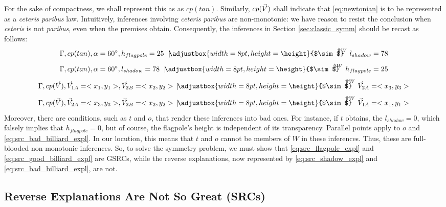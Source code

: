 \documentclass{svjour3}                     %
\newcommand{\ssim}{%
     \setbox0=\hbox{$\sim$}%
     \adjustbox{width=8pt,height=\height}{$\sim$}
}
\newcommand{\Uuparrow}{%
     \setbox0=\hbox{$\scriptstyle\Uparrow$}%
     \raisebox{.2ex}{$\scriptstyle\Uparrow$}
}
\newcommand{\nmc}{\mathbin{\mid\joinrel\!\!\ssim}}
\newcommand{\src}[4][\Gamma,]{{#1#2\,\,\mathrel{\nmc}}^{\!\!\!\!\!\!\!\Uuparrow\scriptstyle #4}\,\,#3}
\newcommand{\degree}{\ensuremath{^\circ}}
\renewcommand\vec{\mathaccent"017E}
\begin{document}
For the sake of compactness, we shall represent this as as $cp(tan)$. Similarly, $cp(\vec{V})$ shall indicate that \eqref{eq:newtonian} is to be represented as a \textit{ceteris paribus} law. Intuitively, inferences involving \textit{ceteris paribus} are non-monotonic: we have reason to resist the conclusion when \textit{ceteris} is not \textit{paribus}, even when the premises obtain. Consequently, the inferences in Section \ref{sec:classic_symm} should be recast as follows:
\begin{equation} \label{eq:src_flagpole_expl}
	\src{cp(tan), \alpha = 60 \degree, h_{flagpole} = 25}{l_{shadow} = 78}{W}
\end{equation}
\begin{equation} \label{eq:src_shadow_expl}
	\src{cp(tan), \alpha = 60 \degree, l_{shadow} = 78}{h_{flagpole} = 25}{W}
\end{equation}
\begin{equation} \label{eq:src_good_billiard_expl}
	\src{cp(\vec{V}), \vec V_{1A} = <x_1, y_1>, \vec V_{2B} = <x_2, y_2>\,}{\vec V_{2A} = <x_3, y_3>}{W}
\end{equation}
\begin{equation} \label{eq:src_bad_billiard_expl}
	\src{cp(\vec{V}),\vec V_{2A} = <x_3, y_3>, \vec V_{2B} = <x_2, y_2>\,}{\vec V_{1A} = <x_1, y_1>}{W}
\end{equation}
Moreover, there are conditions, such as $t$ and $o$, that render these inferences into bad ones. For instance, if $t$ obtains, the $l_{shadow} = 0$, which falsely implies that $h_{flagpole}=0$, but of course, the flagpole's height is independent of its transparency. Parallel points apply to $o$ and \eqref{eq:src_bad_billiard_expl}. In our locution, this means that $t$ and $o$ cannot be members of $W$ in these inferences. Thus, these are full-blooded non-monotonic inferences. So, to solve the symmetry problem, we must show that \eqref{eq:src_flagpole_expl} and \eqref{eq:src_good_billiard_expl} are GSRCs, while the reverse explanations, now represented by \eqref{eq:src_shadow_expl} and \eqref{eq:src_bad_billiard_expl}, are not.\newline


\subsection{Reverse Explanations Are Not So Great (SRCs)}
\label{subsec:not_great}
\end{document}
